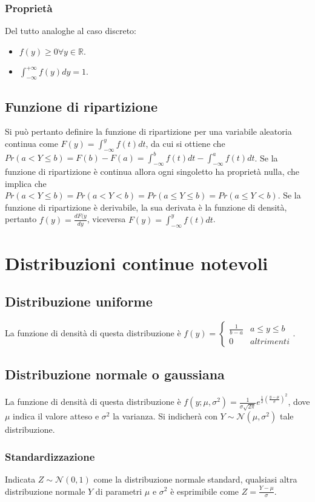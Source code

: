 \subsubsection{Propriet\`a}
Del tutto analoghe al caso discreto:
\begin{itemize}
\item $f(y)\ge 0\forall y\in\mathbb{R}$.
\item $\int_{-\infty}^{+\infty}f(y)dy=1$.
\end{itemize}
\subsection{Funzione di ripartizione}
Si pu\`o pertanto definire la funzione di ripartizione per una variabile aleatoria continua come $F(y)=\int_{-\infty}^yf(t)dt$, da cui si ottiene che $Pr(a<Y\le b)=F(b)-F(a)=
\int_{-\infty}^bf(t)dt-\int_{-\infty}^af(t)dt$. Se la funzione di ripartizione \`e continua allora ogni singoletto ha propriet\`a nulla, che implica che $Pr(a<Y\le b)=Pr(a<Y<
 b)=Pr(a\le Y\le b)=Pr(a\le Y< b)$. Se la funzione di ripartizione \`e derivabile, la sua derivata \`e la funzione di densit\`a, pertanto $f(y)=\frac{dF(y}{dy}$, viceversa 
 $F(y)=\int_{-\infty}^yf(t)dt$.
\section{Distribuzioni continue notevoli}
\subsection{Distribuzione uniforme}
La funzione di densit\`a di questa distribuzione \`e $f(y)=\begin{cases}\frac{1}{b-a}&a\le y\le b\\0&altrimenti\end{cases}$.
\subsection{Distribuzione normale o gaussiana}
La funzione di densit\`a di questa distribuzione \`e $f(y;\mu, \sigma^2)=\frac{1}{\sigma\sqrt{2\pi}}e^{\frac{1}{2}(\frac{y-\mu}{\sigma})^2}$, dove $\mu$ indica il valore atteso
e $\sigma^2$ la varianza. Si indicher\`a con $Y\sim \mathcal{N}(\mu, \sigma^2)$ tale distribuzione.
\subsubsection{Standardizzazione}
Indicata $Z\sim\mathcal{N}(0,1)$ come la distribuzione normale standard, qualsiasi altra distribuzione normale $Y$ di parametri $\mu$ e $\sigma^2$ \`e esprimibile come $Z=\frac{Y-\mu}{\sigma}$.